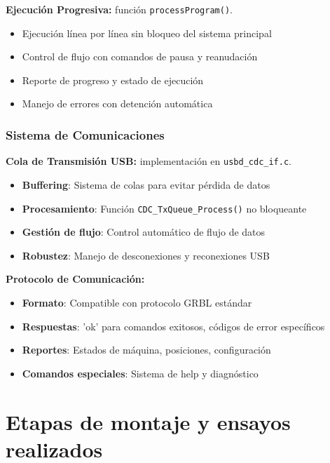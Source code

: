 \documentclass[12pt]{article}
\begin{document}
\textbf{Ejecución Progresiva:} función \texttt{processProgram()}.

\begin{itemize}
    \item Ejecución línea por línea sin bloqueo del sistema principal
    \item Control de flujo con comandos de pausa y reanudación
    \item Reporte de progreso y estado de ejecución
    \item Manejo de errores con detención automática
\end{itemize}

\subsubsection{Sistema de Comunicaciones}

\textbf{Cola de Transmisión USB:} implementación en \texttt{usbd\_cdc\_if.c}.

\begin{itemize}
    \item \textbf{Buffering}: Sistema de colas para evitar pérdida de datos
    \item \textbf{Procesamiento}: Función \texttt{CDC\_TxQueue\_Process()} no bloqueante
    \item \textbf{Gestión de flujo}: Control automático de flujo de datos
    \item \textbf{Robustez}: Manejo de desconexiones y reconexiones USB
\end{itemize}

\textbf{Protocolo de Comunicación:}
\begin{itemize}
    \item \textbf{Formato}: Compatible con protocolo GRBL estándar
    \item \textbf{Respuestas}: 'ok' para comandos exitosos, códigos de error específicos
    \item \textbf{Reportes}: Estados de máquina, posiciones, configuración
    \item \textbf{Comandos especiales}: Sistema de help y diagnóstico
\end{itemize}



\section{Etapas de montaje y ensayos realizados}
\end{document}
